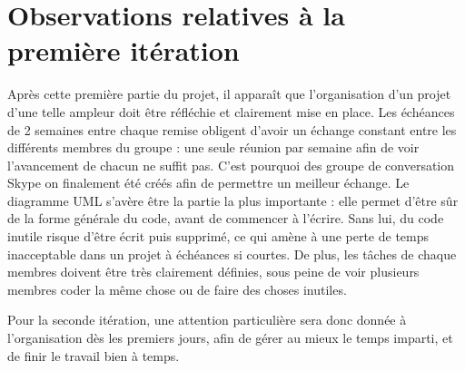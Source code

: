 \documentclass[a4paper, 12pt]{report}
\begin{document}
		\section{Observations relatives à la première itération}
				Après cette première partie du projet, il apparaît que l'organisation d'un projet d'une telle ampleur doit être réfléchie et clairement mise en place. Les échéances de 2 semaines entre chaque remise obligent d'avoir un échange constant entre les différents membres du groupe : une seule réunion par semaine afin de voir l'avancement de chacun ne suffit pas. C'est pourquoi des groupe de conversation Skype on finalement été créés afin de permettre un meilleur échange. Le diagramme UML s'avère être la partie la plus importante : elle permet d'être sûr de la forme générale du code, avant de commencer à l'écrire. Sans lui, du code inutile risque d'être écrit puis supprimé, ce qui amène à une perte de temps inacceptable dans un projet à échéances si courtes. De plus, les tâches de chaque membres doivent être très clairement définies, sous peine de voir plusieurs membres coder la même chose ou de faire des choses inutiles. 
				
				Pour la seconde itération, une attention particulière sera donc donnée à l'organisation dès les premiers jours, afin de gérer au mieux le temps imparti, et de finir le travail bien à temps.
\end{document}
